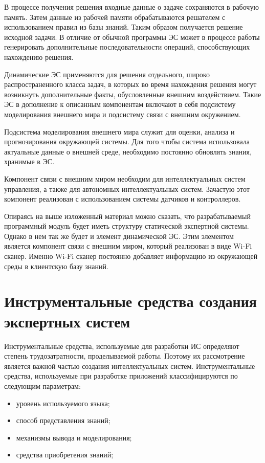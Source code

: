 В процессе получения решения входные данные о задаче сохраняются в рабочую память. Затем данные из рабочей памяти обрабатываются решателем с использованием правил из базы знаний. Таким образом получается решение исходной задачи. В отличие от обычной программы ЭС может в процессе работы генерировать дополнительные последовательности операций, способствующих нахождению решения.
    
Динамические ЭС применяются для решения отдельного, широко распространенного класса задач, в которых во время нахождения решения могут возникнуть дополнительные факты, обусловленные внешним воздействием. Такие ЭС в дополнение к описанным компонентам включают в себя подсистему моделирования внешнего мира и подсистему связи с внешним окружением.

Подсистема моделирования внешнего мира служит для оценки, анализа и прогнозирования окружающей системы. Для того чтобы система использовала актуальные данные о внешней среде, необходимо постоянно обновлять знания, хранимые в ЭС.

Компонент связи с внешним миром необходим для интеллектуальных систем управления, а также для автономных интеллектуальных систем. Зачастую этот компонент реализован с использованием системы датчиков и контроллеров.

Опираясь на выше изложенный материал можно сказать, что разрабатываемый программный модуль будет иметь структуру статической экспертной системы. Однако в нем так же будет и элемент динамической ЭС. Этим элементом является компонент связи с внешним миром, который реализован в виде Wi-Fi сканер. Именно Wi-Fi сканер постоянно добавляет информацию из окружающей среды в клиентскую базу знаний.

\section{Инструментальные средства создания экспертных систем}

Инструментальные средства, используемые для разработки ИС определяют степень трудозатратности, проделываемой работы. Поэтому их рассмотрение является важной частью создания интеллектуальных систем. Инструментальные средства, используемые при разработке приложений классифицируются по следующим параметрам:

\begin{itemize}
	\item уровень используемого языка;
	\item способ представления знаний;
	\item механизмы вывода и моделирования;
	\item средства приобретения знаний;
\end{itemize}

